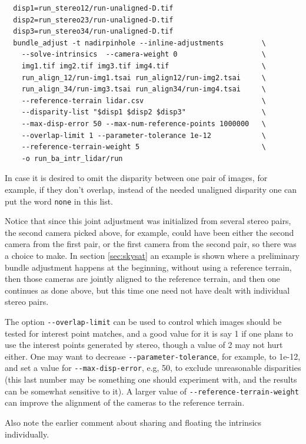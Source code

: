 \begin{verbatim}
  disp1=run_stereo12/run-unaligned-D.tif
  disp2=run_stereo23/run-unaligned-D.tif
  disp3=run_stereo34/run-unaligned-D.tif
  bundle_adjust -t nadirpinhole --inline-adjustments         \
    --solve-intrinsics  --camera-weight 0                    \
    img1.tif img2.tif img3.tif img4.tif                      \
    run_align_12/run-img1.tsai run_align12/run-img2.tsai     \
    run_align_34/run-img3.tsai run_align34/run-img4.tsai     \
    --reference-terrain lidar.csv                            \
    --disparity-list "$disp1 $disp2 $disp3"                  \
    --max-disp-error 50 --max-num-reference-points 1000000   \
    --overlap-limit 1 --parameter-tolerance 1e-12            \
    --reference-terrain-weight 5                             \   
    -o run_ba_intr_lidar/run
\end{verbatim}
In case it is desired to omit the disparity between one pair
of images, for example, if they don't overlap, instead of
the needed unaligned disparity one can put the word \texttt{none} in this list.

Notice that since this joint adjustment was initialized from several stereo pairs,
the second camera picked above, for example, could have been either the second camera 
from the first pair, or the first camera from the second pair, so there was a choice
to make. In section \ref{sec:skysat} an example is shown where a preliminary bundle
adjustment happens at the beginning, without using a reference terrain, then those
cameras are jointly aligned to the reference terrain, and then one continues as
done above, but this time one need not have dealt with individual stereo pairs. 

The option \texttt{-\/-overlap-limit} can be used to control which images should be
tested for interest point matches, and a good value for it is say 1 if
one plans to use the interest points generated by stereo, though a value
of 2 may not hurt either. One may want to decrease
\texttt{-\/-parameter-tolerance}, for example, to 1e-12, and set a value
for \texttt{-\/-max-disp-error}, e.g, 50, to exclude unreasonable
disparities (this last number may be something one should experiment with,
and the results can be somewhat sensitive to it). A larger value of 
\texttt{-\/-reference-terrain-weight} can improve the alignment
of the cameras to the reference terrain.

Also note the earlier comment about sharing and floating the intrinsics individually. 

